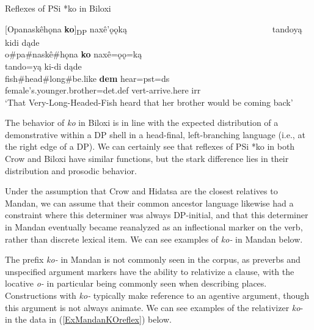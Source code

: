 \begin{exe} 
\item\label{ExBiloxiKOreflex} Reflexes of PSi *ko in Biloxi

\glll \textnormal{[}Opanaskêhǫna \textbf{ko}\textnormal{]\textsubscript{DP}} naxê'ǫǫką ~ ~ ~ ~ ~ ~ ~ ~ ~ ~ ~ ~ ~ ~ ~ ~ ~ ~ ~ ~ tandoyą kidi dąde\\
	o\#pa\#naskê\#hǫna \textbf{ko} naxê=ǫǫ=ką ~ ~ ~ ~ ~ ~ ~ ~ ~ ~ ~ ~ ~ ~ ~ ~ ~ ~ ~ ~ tando=yą ki-di dąde\\
	\textnormal{fish}\#\textnormal{head}\#\textnormal{long}\#\textnormal{be.like} \textbf{dem} \textnormal{hear}=pst=ds ~ ~ ~ ~ ~ ~ ~ ~ ~ ~ ~ ~ ~ ~ ~ ~ ~ ~ ~ ~  \textnormal{female's.younger.brother}=det.def vert-\textnormal{arrive.here} irr\\
	\glt `That Very-Long-Headed-Fish heard that her brother would be coming back' \citep[128]{torres2010}

\end{exe}

The behavior of \textit{ko} in Biloxi is in line with the expected distribution of a demonstrative within a DP shell in a head-final, left-branching language (i.e., at the right edge of a DP). We can certainly see that reflexes of PSi *ko in both Crow and Biloxi have similar functions, but the stark difference lies in their distribution and prosodic behavior. 

Under the assumption that Crow and Hidatsa are the closest relatives to Mandan, we can assume that their common ancestor language likewise had a constraint where this determiner was always DP-initial, and that this determiner in Mandan eventually became reanalyzed as an inflectional marker on the verb, rather than discrete lexical item. We can see examples of \textit{ko-} in Mandan below.

The prefix \textit{ko-} in Mandan is not commonly seen in the corpus, as preverbs and unspecified argument markers have the ability to relativize a clause, with the locative \textit{o-} in particular being commonly seen when describing places. Constructions with \textit{ko-} typically make reference to an agentive argument, though this argument is not always animate. We can see examples of the relativizer \textit{ko}- in the data in (\ref{ExMandanKOreflex}) below.

